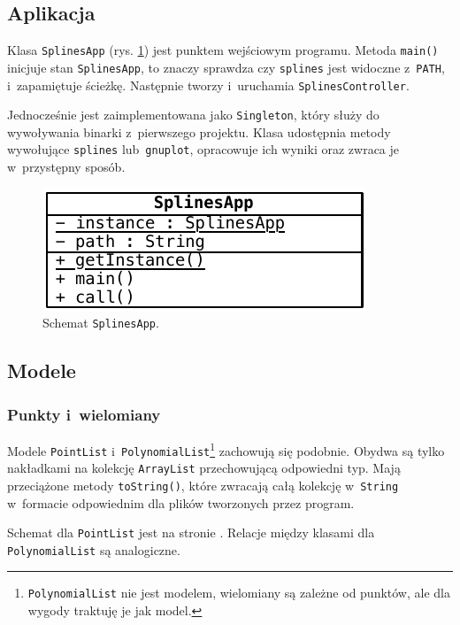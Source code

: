 \documentclass[10pt,a4paper]{article}
\newcommand{\f}[1]{\texttt{#1}}
\begin{document}
\subsection{Aplikacja}

Klasa \f{SplinesApp} (rys. \ref{fig:aplikacja-szczegolowo}) jest punktem
wejściowym programu. Metoda \f{main()} inicjuje stan \f{SplinesApp}, to znaczy
sprawdza czy \f{splines} jest widoczne z~\f{PATH}, i~zapamiętuje ścieżkę.
Następnie tworzy i~uruchamia \f{SplinesController}.

Jednocześnie jest zaimplementowana jako \f{Singleton}, który służy do
wywoływania binarki z~pierwszego projektu. Klasa udostępnia metody wywołujące
\f{splines} lub~\f{gnuplot}, opracowuje ich wyniki oraz zwraca je w~przystępny
sposób.

\begin{figure}[hb]
  \centering
  \includegraphics{figury/aplikacja-szczegolowo}
  \caption{Schemat \f{SplinesApp}.}
  \label{fig:aplikacja-szczegolowo}
\end{figure}

\subsection{Modele}

\subsubsection{Punkty i~wielomiany}

Modele \f{PointList} i~\f{PolynomialList}\footnote{\f{PolynomialList} nie jest
modelem, wielomiany są zależne od punktów, ale dla wygody traktuję je jak
model.} zachowują się podobnie. Obydwa są tylko nakładkami na kolekcję
\f{ArrayList} przechowującą odpowiedni typ. Mają przeciążone metody
\f{toString()}, które zwracają całą kolekcję w~\f{String} w~formacie
odpowiednim dla plików tworzonych przez program.

Schemat dla \f{PointList} jest na stronie \pageref{fig:punkty-szczegolowo}.
Relacje między klasami dla \f{PolynomialList} są analogiczne.
\end{document}

